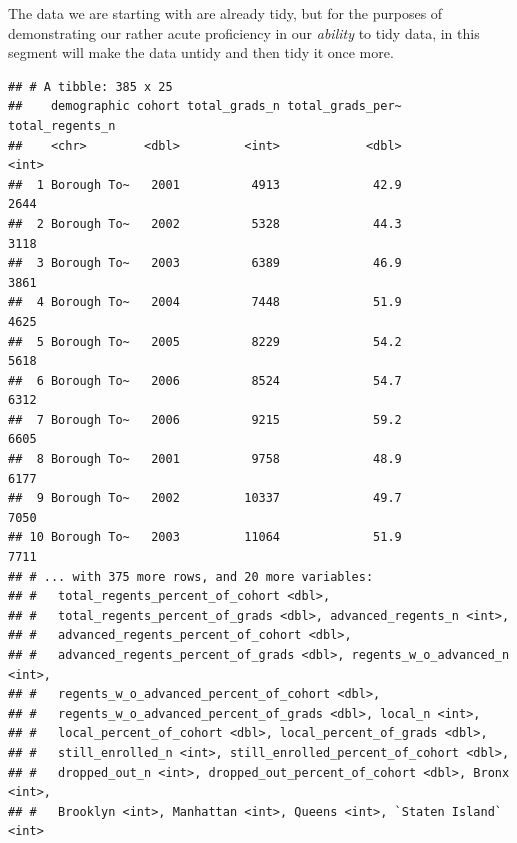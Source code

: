 \documentclass[
  english,
  man, fleqn, noextraspace]{apa6}
\newenvironment{Shaded}{\begin{snugshade}}{\end{snugshade}}
\newcommand{\DataTypeTok}[1]{\textcolor[rgb]{0.13,0.29,0.53}{#1}}
\newcommand{\KeywordTok}[1]{\textcolor[rgb]{0.13,0.29,0.53}{\textbf{#1}}}
\newcommand{\NormalTok}[1]{#1}
\newcommand{\OperatorTok}[1]{\textcolor[rgb]{0.81,0.36,0.00}{\textbf{#1}}}
\newcommand{\StringTok}[1]{\textcolor[rgb]{0.31,0.60,0.02}{#1}}
\begin{document}
The data we are starting with are already tidy, but for the purposes of demonstrating our rather acute proficiency in our \emph{ability} to tidy data, in this segment will make the data untidy and then tidy it once more.

\begin{Shaded}
\end{Shaded}

\begin{verbatim}
## # A tibble: 385 x 25
##    demographic cohort total_grads_n total_grads_per~ total_regents_n
##    <chr>        <dbl>         <int>            <dbl>           <int>
##  1 Borough To~   2001          4913             42.9            2644
##  2 Borough To~   2002          5328             44.3            3118
##  3 Borough To~   2003          6389             46.9            3861
##  4 Borough To~   2004          7448             51.9            4625
##  5 Borough To~   2005          8229             54.2            5618
##  6 Borough To~   2006          8524             54.7            6312
##  7 Borough To~   2006          9215             59.2            6605
##  8 Borough To~   2001          9758             48.9            6177
##  9 Borough To~   2002         10337             49.7            7050
## 10 Borough To~   2003         11064             51.9            7711
## # ... with 375 more rows, and 20 more variables:
## #   total_regents_percent_of_cohort <dbl>,
## #   total_regents_percent_of_grads <dbl>, advanced_regents_n <int>,
## #   advanced_regents_percent_of_cohort <dbl>,
## #   advanced_regents_percent_of_grads <dbl>, regents_w_o_advanced_n <int>,
## #   regents_w_o_advanced_percent_of_cohort <dbl>,
## #   regents_w_o_advanced_percent_of_grads <dbl>, local_n <int>,
## #   local_percent_of_cohort <dbl>, local_percent_of_grads <dbl>,
## #   still_enrolled_n <int>, still_enrolled_percent_of_cohort <dbl>,
## #   dropped_out_n <int>, dropped_out_percent_of_cohort <dbl>, Bronx <int>,
## #   Brooklyn <int>, Manhattan <int>, Queens <int>, `Staten Island` <int>
\end{verbatim}
\end{document}
